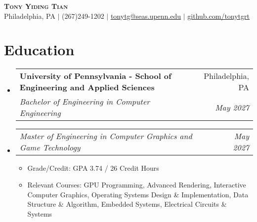 \documentclass[letterpaper,11pt]{article}
\makeatletter
\newcommand{\resumeItem}[1]{
  \item\small{
    {#1 \vspace{-3pt}}
  }
}
\newcommand{\resumeSubheading}[4]{
  \vspace{-2pt}\item
    \begin{tabular*}{0.97\textwidth}[t]{l@{\extracolsep{\fill}}r}
      \textbf{#1} & #2 \\
      \textit{\small#3} & \textit{\small #4} \\
    \end{tabular*}\vspace{-7pt}
}
\newcommand{\resumeSubSubheading}[2]{
    \vspace{-7pt}\item
    \begin{tabular*}{0.97\textwidth}{l@{\extracolsep{\fill}}r}
      \textit{\small#1} & \textit{\small #2} \\
    \end{tabular*}\vspace{-7pt}
}
\newcommand{\resumeSubHeadingListStart}{\begin{itemize}[leftmargin=0.15in, label={}]}
\newcommand{\resumeSubHeadingListEnd}{\end{itemize}}
\newcommand{\resumeItemListStart}{\begin{itemize}}
\newcommand{\resumeItemListEnd}{\end{itemize}\vspace{-5pt}}
\makeatother
\begin{document}

\begin{center}
    \textbf{\Huge \scshape Tony Yiding Tian} \\ \vspace{1pt}
    \small Philadelphia, PA $|$ (267)249-1202 $|$ \href{mailto:tonytg@seas.upenn.edu}{\underline{tonytg@seas.upenn.edu}} $|$ 
    \href{https://github.com/tonytgrt}{\underline{github.com/tonytgrt}}
\end{center}


\section{Education}
  \resumeSubHeadingListStart
    \resumeSubheading
      {University of Pennsylvania - School of Engineering and Applied Sciences}{Philadelphia, PA}
      {Bachelor of Engineering in Computer Engineering}{May 2027}
    \resumeSubSubheading
      {Master of Engineering in Computer Graphics and Game Technology}{May 2027}
      \resumeItemListStart
        \resumeItem{Grade/Credit: GPA 3.74 / 26 Credit Hours}
        \resumeItem{Relevant Courses: GPU Programming, Advanced Rendering, Interactive Computer Graphics, Operating Systems Design \& Implementation, Data Structure \& Algorithm, Embedded Systems, Electrical Circuits \& Systems}
      \resumeItemListEnd
  \resumeSubHeadingListEnd


\end{document}
